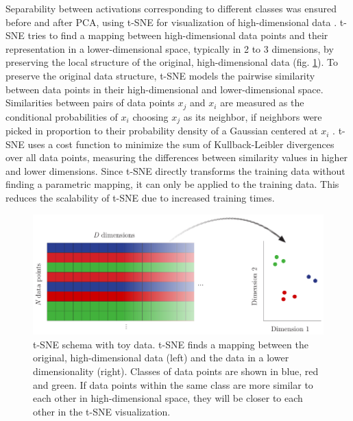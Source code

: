 \documentclass[10pt]{article}
\begin{document}
Separability between activations corresponding to different classes was ensured before and after \gls{PCA}, using \acrfull{t-SNE} for visualization of high-dimensional data \cite{Maaten2008VisualizingDU}. \gls{t-SNE} tries to find a mapping between high-dimensional data points and their representation in a lower-dimensional space, typically in 2 to 3 dimensions, by preserving the local structure of the original, high-dimensional data (fig. \ref{fig:t-SNE-schema}). To preserve the original data structure, \gls{t-SNE} models the pairwise similarity between data points in their high-dimensional and lower-dimensional space. Similarities between pairs of data points $x_j$ and $x_i$ are measured as the conditional probabilities of $x_i$ choosing $x_j$ as its neighbor, if neighbors were picked in proportion to their probability density of a Gaussian centered at $x_i$ \cite{Maaten2008VisualizingDU}. \gls{t-SNE} uses a cost function to minimize the sum of Kullback-Leibler divergences over all data points, measuring the differences between similarity values in higher and lower dimensions. Since \gls{t-SNE} directly transforms the training data without finding a parametric mapping, it can only be applied to the training data. This reduces the scalability of \gls{t-SNE} due to increased training times.

\begin{figure}[H]
	\centering
	\includegraphics[width=.9\textwidth]{Schema/t-SNE-schema}
	\caption{\gls{t-SNE} schema with toy data. \gls{t-SNE} finds a mapping between the original, high-dimensional data (left) and the data in a lower dimensionality (right). Classes of data points are shown in blue, red and green. If data points within the same class are more similar to each other in high-dimensional space, they will be closer to each other in the \gls{t-SNE} visualization.}
	\label{fig:t-SNE-schema}
\end{figure}
\end{document}
